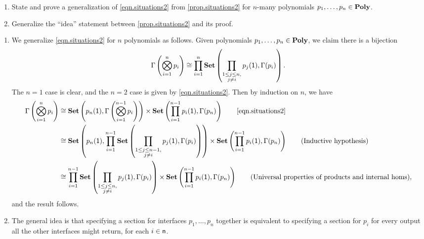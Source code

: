 \documentclass[Book-Poly]{subfiles}
\begin{document}
\begin{exercise}
\begin{enumerate}
	\item State and prove a generalization of \eqref{eqn.situations2} from \cref{prop.situations2} for $n$-many polynomials $p_1,\ldots,p_n\in\mathbf{Poly}$.
	\item Generalize the ``idea'' statement between \cref{prop.situations2} and its proof.
\qedhere
\end{enumerate}
\begin{solution}
\begin{enumerate}
    \item We generalize \eqref{eqn.situations2} for $n$ polynomials as follows.
    Given polynomials $p_1,\ldots,p_n\in\mathbf{Poly}$, we claim there is a bijection
    \[
        \Gamma\left(\bigotimes_{i=1}^n p_i \right) \cong \prod_{i=1}^n \mathbf{Set}\left(\prod_{\substack{1 \leq j \leq n, \\ j \neq i}} p_j(\textsf{1}), \Gamma(p_i)\right).
    \]
    The $n=1$ case is clear, and the $n=2$ case is given by \eqref{eqn.situations2}.
    Then by induction on $n$, we have
    \begin{align*}
        \Gamma\left(\bigotimes_{i=1}^n p_i \right) &\iso \smset\left(p_n(\1), \Gamma\left(\bigotimes_{i=1}^{n-1} p_i \right)\right) \times \smset\left(\prod_{i=1}^{n-1} p_i(\1), \Gamma(p_n)\right) \tag*{\eqref{eqn.situations2}} \\
        &\iso \smset\left(p_n(\1), \prod_{i=1}^{n-1} \smset\left(\prod_{\substack{1 \leq j \leq n-1, \\ j \neq i}} p_j(\1), \Gamma(p_i)\right)\right) \times \smset\left(\prod_{i=1}^{n-1} p_i(\1), \Gamma(p_n)\right) \tag{Inductive hypothesis} \\
        &\iso \prod_{i=1}^{n-1} \smset\left(\prod_{\substack{1 \leq j \leq n, \\ j \neq i}} p_j(\1), \Gamma(p_i)\right) \times \smset\left(\prod_{i=1}^{n-1} p_i(\1), \Gamma(p_n)\right) \tag{Universal properties of products and internal homs},
    \end{align*}
    and the result follows.
    \item The general idea is that specifying a section for interfaces $p_1,\ldots,p_n$ together is equivalent to specifying a section for $p_i$ for every output all the other interfaces might return, for each $i\in\mathsf{n}$.
\end{enumerate}
\end{solution}
\end{exercise}
\end{document}
